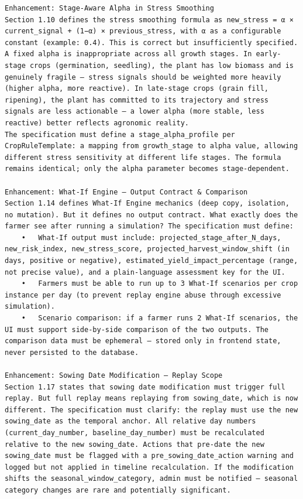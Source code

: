 \documentclass{article}
\begin{document}
\begin{verbatim}
Enhancement: Stage-Aware Alpha in Stress Smoothing
Section 1.10 defines the stress smoothing formula as new_stress = α × current_signal + (1−α) × previous_stress, with α as a configurable constant (example: 0.4). This is correct but insufficiently specified.
A fixed alpha is inappropriate across all growth stages. In early-stage crops (germination, seedling), the plant has low biomass and is genuinely fragile — stress signals should be weighted more heavily (higher alpha, more reactive). In late-stage crops (grain fill, ripening), the plant has committed to its trajectory and stress signals are less actionable — a lower alpha (more stable, less reactive) better reflects agronomic reality.
The specification must define a stage_alpha_profile per CropRuleTemplate: a mapping from growth_stage to alpha value, allowing different stress sensitivity at different life stages. The formula remains identical; only the alpha parameter becomes stage-dependent.

Enhancement: What-If Engine — Output Contract & Comparison
Section 1.14 defines What-If Engine mechanics (deep copy, isolation, no mutation). But it defines no output contract. What exactly does the farmer see after running a simulation? The specification must define:
	•	What-If output must include: projected_stage_after_N_days, new_risk_index, new_stress_score, projected_harvest_window_shift (in days, positive or negative), estimated_yield_impact_percentage (range, not precise value), and a plain-language assessment key for the UI.
	•	Farmers must be able to run up to 3 What-If scenarios per crop instance per day (to prevent replay engine abuse through excessive simulation).
	•	Scenario comparison: if a farmer runs 2 What-If scenarios, the UI must support side-by-side comparison of the two outputs. The comparison data must be ephemeral — stored only in frontend state, never persisted to the database.

Enhancement: Sowing Date Modification — Replay Scope
Section 1.17 states that sowing date modification must trigger full replay. But full replay means replaying from sowing_date, which is now different. The specification must clarify: the replay must use the new sowing_date as the temporal anchor. All relative day numbers (current_day_number, baseline_day_number) must be recalculated relative to the new sowing_date. Actions that pre-date the new sowing_date must be flagged with a pre_sowing_date_action warning and logged but not applied in timeline recalculation. If the modification shifts the seasonal_window_category, admin must be notified — seasonal category changes are rare and potentially significant.


\end{verbatim}
\end{document}
